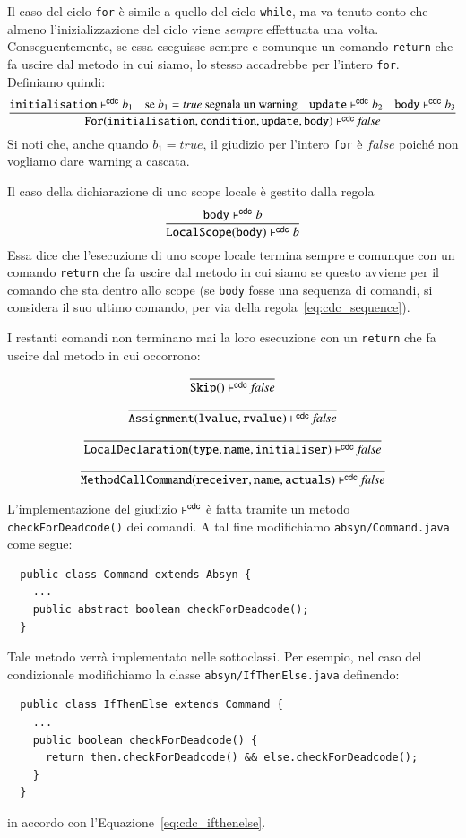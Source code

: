 Il caso del ciclo \texttt{for} \`e simile a quello del ciclo \texttt{while},
ma va tenuto conto che almeno l'inizializzazione del ciclo viene \emph{sempre}
effettuata una volta. Conseguentemente, se essa eseguisse sempre e comunque
un comando \texttt{return} che fa uscire dal metodo in cui siamo, lo stesso
accadrebbe per l'intero \texttt{for}. Definiamo quindi:
%
\begin{equation}\label{eq:cdc_for}
  \frac{\mathtt{initialisation}\vdash^{\mathsf{cdc}} b_1\quad
        \text{se }b_1=\mathit{true}\text{ segnala un warning}
        \quad\mathtt{update}\vdash^{\mathsf{cdc}} b_2\quad\mathtt{body}\vdash^{\mathsf{cdc}} b_3}
    {\mathtt{For(initialisation,condition,update,body)}\vdash^{\mathsf{cdc}}\mathit{false}}
\end{equation}
%
Si noti che, anche quando $b_1=\mathit{true}$, il giudizio per l'intero
\texttt{for} \`e $\mathit{false}$ poich\'e non vogliamo dare warning
a cascata.

Il caso della dichiarazione di uno scope locale \`e gestito dalla regola
%
\[
  \frac{\mathtt{body}\vdash^{\mathsf{cdc}} b}{\mathtt{LocalScope(body)}\vdash^{\mathsf{cdc}} b}
\]
%
Essa dice che l'esecuzione di uno scope locale termina sempre e comunque
con un comando \texttt{return} che fa uscire dal metodo in cui siamo
se questo avviene per il comando che sta
dentro allo scope (se \texttt{body} fosse una sequenza di comandi, si considera
il suo ultimo comando, per via della regola~\eqref{eq:cdc_sequence}).

I restanti comandi non terminano mai la loro esecuzione con un \texttt{return}
che fa uscire dal metodo in cui occorrono:
%
\[
  \frac{}{\mathtt{Skip()}\vdash^{\mathsf{cdc}}\mathit{false}}
\]
\[
  \frac{}{\mathtt{Assignment(lvalue,rvalue)}\vdash^{\mathsf{cdc}}\mathit{false}}
\]
\[
  \frac{}{\mathtt{LocalDeclaration(type,name,initialiser)}\vdash^{\mathsf{cdc}}\mathit{false}}
\]
\[
  \frac{}{\mathtt{MethodCallCommand(receiver,name,actuals)}\vdash^{\mathsf{cdc}}
    \mathit{false}}
\]

L'implementazione del giudizio $\vdash^{\mathsf{cdc}}$ \`e fatta tramite un metodo
\texttt{checkForDeadcode()} dei comandi.
A tal fine modifichiamo \texttt{absyn/Command.java} come segue:
%
\begin{verbatim}
  public class Command extends Absyn {
    ...
    public abstract boolean checkForDeadcode();
  }
\end{verbatim}
%
Tale metodo verr\`a implementato nelle sottoclassi. Per
esempio, nel caso del condizionale modifichiamo la classe
\texttt{absyn/IfThenElse.java} definendo:
%
\begin{verbatim}
  public class IfThenElse extends Command {
    ...
    public boolean checkForDeadcode() {
      return then.checkForDeadcode() && else.checkForDeadcode();
    }
  }
\end{verbatim}
%
in accordo con l'Equazione~\eqref{eq:cdc_ifthenelse}.

